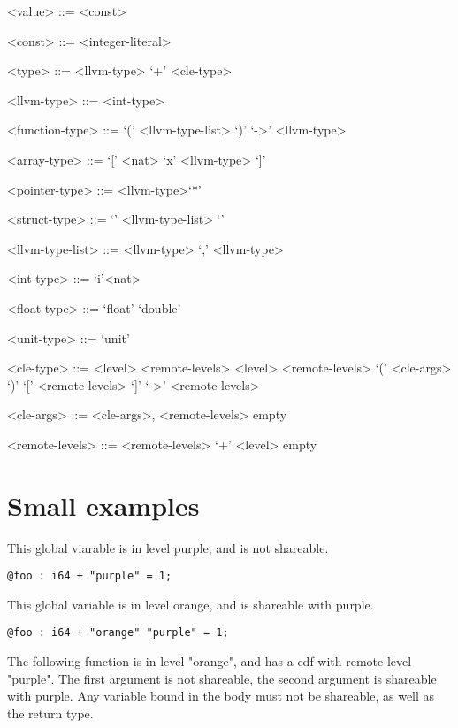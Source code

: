 \documentclass{article}
\begin{document}
\begin{grammar}
<value> ::= <const>

<const> ::= <integer-literal>

<type> ::= <llvm-type> `+' <cle-type>

<llvm-type> ::= <int-type>

<function-type> ::= `(' <llvm-type-list> `)' `->' <llvm-type>

<array-type> ::= `[' <nat> `x' <llvm-type> `]'

<pointer-type> ::= <llvm-type>`*'

<struct-type> ::= `{' <llvm-type-list> `}'

<llvm-type-list> ::= <llvm-type>
`,' <llvm-type>

<int-type> ::= `i'<nat>

<float-type> ::= `float' 
\alt `double'

<unit-type> ::= `unit'

<cle-type> ::= <level> <remote-levels> 
\alt <level> <remote-levels> `(' <cle-args> `)' `[' <remote-levels> `]' `->' <remote-levels> 

<cle-args> ::= <cle-args>, <remote-levels> \alt empty

<remote-levels> ::=  <remote-levels> `+' <level> \alt empty 

\end{grammar}

\section{Small examples}

This global viarable is in level purple, and is not shareable.
\begin{verbatim}
@foo : i64 + "purple" = 1;
\end{verbatim}


This global variable is in level orange, and is shareable with purple.
\begin{verbatim}
@foo : i64 + "orange" "purple" = 1;
\end{verbatim}


The following function is in level "orange", and has a cdf with remote level "purple".
The first argument is not shareable, 
the second argument is shareable with purple. 
Any variable bound in the body must not be shareable, as well as the return type.
\end{document}
